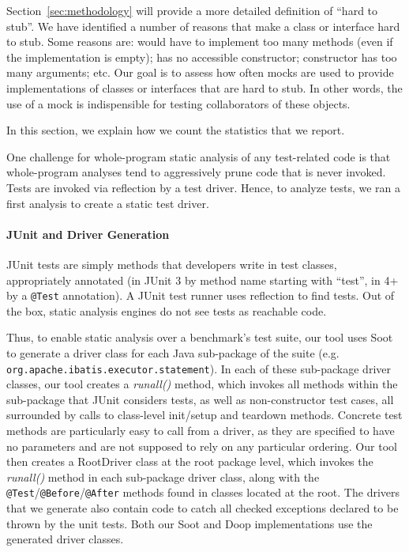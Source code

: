 \label{sec:methodology}


Section~\ref{sec:methodology} will provide a more detailed definition of ``hard to stub''. We have identified a number of reasons that make a class or interface hard to stub. Some reasons are: would have to implement too many methods (even if the implementation is empty); has no accessible constructor; constructor has too many arguments; etc. Our goal is to assess how often mocks are used to provide implementations of classes or interfaces that are hard to stub. In other words, the use of a mock is indispensible for testing collaborators of these objects.

In this section, we explain how we count the statistics that we report.

One challenge for whole-program static analysis of any test-related code is that whole-program
analyses tend to aggressively prune code that is never invoked. Tests are invoked via reflection
by a test driver. Hence, to analyze tests, we ran a first analysis to create a static test driver.

\paragraph{JUnit and Driver Generation}
JUnit tests are simply methods that developers write in test classes, appropriately annotated (in JUnit 3 by method name starting with ``test'', in 4+ by a \texttt{@Test} annotation). A JUnit test runner uses reflection to find tests. Out of the box, static analysis engines do not see tests as reachable code.


Thus, to enable static analysis over a benchmark's test suite, our tool uses Soot to generate a driver class for each Java sub-package of the suite (e.g. \texttt{org.apache.ibatis.executor.statement}). In each of these sub-package driver classes, our tool creates a \textit{runall()} method, which invokes all methods within the sub-package that JUnit considers tests, as well as non-constructor test cases, all surrounded by calls to class-level init/setup and teardown methods. Concrete test methods are particularly easy to call from a driver, as they are specified to have no parameters and are not supposed to rely on any particular ordering. 
Our tool then creates a RootDriver class at the root package level, which invokes the \textit{runall()} method in each sub-package driver class, along with the \texttt{@Test}/\texttt{@Before}/\texttt{@After} methods found in classes located at the root. The drivers that we generate also contain code to catch all checked exceptions declared to be thrown by the unit tests. Both our Soot and Doop implementations use the generated driver classes.

